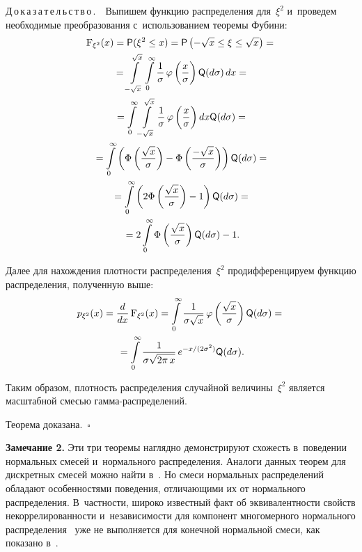 \begin{multicols}{2}
\smallskip

\noindent
Д\,о\,к\,а\,з\,а\,т\,е\,л\,ь\,с\,т\,в\,о\,.\ \
Выпишем функцию распределения для~$\xi^2$ и~проведем 
необходимые преобразования с~использованием теоремы Фубини:
\begin{multline*}
\mathrm{F}_{\xi^2}(x) = {\sf P} (\xi^2 \leq x) =  {\sf P} \left( -\sqrt{x} \leq \xi \leq \sqrt{x}\right) = {}\\
{}=
\int\limits_{-\sqrt{x}}^{\sqrt{x}} \int\limits_{0}^{\infty} \displaystyle\frac{\displaystyle 1\mathstrut}{\displaystyle \sigma\mathstrut}\, 
\varphi\left(\displaystyle\frac{\displaystyle x\mathstrut}{\displaystyle \sigma\mathstrut}\right) {\sf Q} (d\sigma)\, {d}x ={} \\
{}= \int\limits_{0}^{\infty} \int\limits_{-\sqrt{x}}^{\sqrt{x}} \displaystyle\frac{\displaystyle 1\mathstrut}{\displaystyle \sigma\mathstrut} \,
\varphi\left(\displaystyle\frac{\displaystyle x\mathstrut}{\displaystyle \sigma\mathstrut}\right)  {d}x {\sf Q} (d\sigma) = {}\\
{}=
\int\limits_{0}^{\infty} \left(\Phi\left(\displaystyle\frac{\displaystyle \sqrt{x}\mathstrut}{\displaystyle \sigma\mathstrut}\right) - \Phi\left(\displaystyle\frac{\displaystyle -\sqrt{x}\mathstrut}{\displaystyle \sigma\mathstrut}\right)\right) 
{\sf Q} (d\sigma) = {}\\
{}= \int\limits_{0}^{\infty} \left( 2 \Phi\left(\displaystyle\frac{\displaystyle \sqrt{x}\mathstrut}{\displaystyle \sigma\mathstrut}\right) - 1\right) {\sf Q} (d\sigma) ={}\\
{}=
 2 \int\limits_{0}^{\infty} \Phi\left(\displaystyle\frac{\displaystyle \sqrt{x}\mathstrut}{\displaystyle \sigma\mathstrut}\right) {\sf Q} (d\sigma) - 1.
\end{multline*}

Далее для нахождения плотности распределения~$\xi^2$ продифференцируем функцию распределения, полученную выше:
\begin{multline*}
{p}_{\xi^2}(x) = \displaystyle\frac{\displaystyle {d}\mathstrut}{\displaystyle {d}x\mathstrut}\,\mathrm{F}_{\xi^2}(x) = 
\int\limits_{0}^{\infty} \displaystyle\frac{\displaystyle 1\mathstrut}{\displaystyle \sigma \sqrt{x}\mathstrut} \,\varphi\left(\displaystyle\frac{\displaystyle \sqrt{x}\mathstrut}{\displaystyle \sigma\mathstrut}\right)
 {\sf Q} (d\sigma) ={}\\
 {}=
  \int\limits_{0}^{\infty} \displaystyle\frac{\displaystyle 1\mathstrut}{\displaystyle \sigma \sqrt{2\pi \, x}\mathstrut}\, e^{-{x}/({2\sigma^2})} {\sf Q} (d\sigma).
\end{multline*}

Таким образом, плотность распределения случайной величины~$\xi^2$ является масштабной 
смесью гам\-ма-рас\-пре\-де\-ле\-ний.


Теорема доказана.~\hfill$\square$

\smallskip

\noindent
\textbf{Замечание 2.} Эти три теоремы наглядно демонстрируют схожесть в~поведении 
нормальных смесей и~нормального распределения. Аналоги данных теорем для дискретных 
смесей можно найти в~\cite{simple_mix}. Но смеси нормальных распределений обладают 
особенностями поведения, отличающими их от нормального распределения.
В~част\-ности, широко известный факт об эквивалентности свойств некоррелированности 
и~независимости для компонент многомерного нормального распределения~\cite{borovkov}
уже не выполняется для конечной нормальной смеси, как показано в~\cite{simple_mix}.


\end{multicols}

